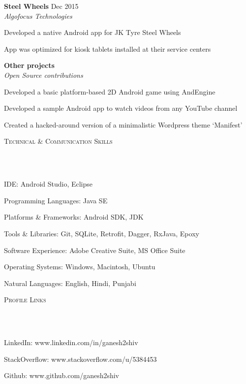 \documentclass{article}
\newcommand{\header}[1]{{
\hspace*{-15pt}\vspace*{6pt} \textsc{#1}} \vspace*{-6pt} 
\lineunder
}
\newcommand{\lineunder}{
\vspace*{-8pt} \\ \hspace*{-18pt} 
\hrulefill \\
}
\newcommand{\project}[4]{{
\vspace*{2pt}%
\textbf{#1} #2 \hfill #3\\ \textit{#4} \vspace*{2pt}}
}
\renewcommand{\labelitemii}{
$\vcenter{\hbox{\tiny$\bullet$}}$\hspace*{-3pt}
}
\newenvironment{bullet-list-major}{
\begin{list}{\labelitemii}{\setlength\leftmargin{3pt} 
\topsep 0pt \itemsep -2pt}}{\vspace*{4pt}\end{list}
}
\newenvironment{bullet-list-minor}{
\begin{list}{\labelitemii}{\setlength\leftmargin{15pt} 
\topsep 0pt \itemsep -2pt}}{\vspace*{4pt}\end{list}
}
\begin{document}
    \project{Steel Wheels}{}{Dec 2015}{Algofocus Technologies}
	\begin{bullet-list-minor}
    \item Developed a native Android app for JK Tyre Steel Wheels
    \item App was optimized for kiosk tablets installed at their service centers
	\end{bullet-list-minor}
	
    \project{Other projects}{}{}{Open Source contributions}
	\begin{bullet-list-minor}
    \item Developed a basic platform-based 2D Android game using AndEngine
	\vspace{2pt}
    \item Developed a sample Android app to watch videos from any YouTube channel
    \vspace{2pt}
    \item Created a hacked-around version of a minimalistic Wordpress theme `Manifest'
	\end{bullet-list-minor}

\vspace*{4pt}%
\header{Technical \& Communication Skills}
    \begin{bullet-list-major}
    \item IDE: Android Studio, Eclipse
    \vspace{2pt}
    \item Programming Languages: Java SE
    \vspace{2pt}
    \item Platforms \& Frameworks: Android SDK, JDK
    \vspace{2pt}
    \item Tools \& Libraries: Git, SQLite, Retrofit, Dagger, RxJava, Epoxy
    \vspace{2pt}
    \item Software Experience: Adobe Creative Suite, MS Office Suite
    \vspace{2pt}
    \item Operating Systems: Windows, Macintosh, Ubuntu
    \vspace{2pt}
    \item Natural Languages: English, Hindi, Punjabi
    \end{bullet-list-major}

\vspace*{4pt}%
\header{Profile Links}
    \begin{bullet-list-major}
    \item LinkedIn: www.linkedin.com/in/ganesh2shiv
    \vspace{2pt}
    \item StackOverflow: www.stackoverflow.com/u/5384453
    \vspace{2pt}
    \item Github: www.github.com/ganesh2shiv
    \end{bullet-list-major}
\end{document}
